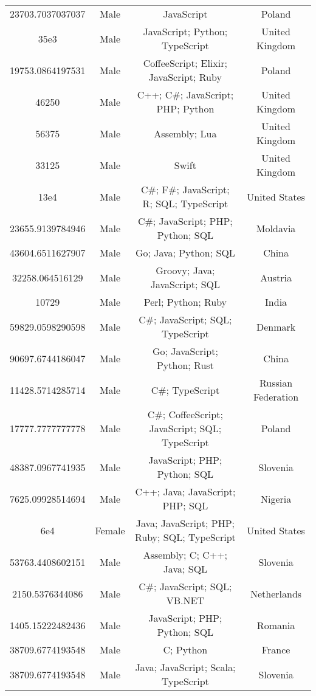 \begin{center}
\begin{tabular}{ |c|c|c|c| }
23703.7037037037  &  Male  &  JavaScript  &  Poland  \\ 
35e3  &  Male  &  JavaScript; Python; TypeScript  &  United Kingdom  \\ 
19753.0864197531  &  Male  &  CoffeeScript; Elixir; JavaScript; Ruby  &  Poland  \\ 
46250  &  Male  &  C++; C\#; JavaScript; PHP; Python  &  United Kingdom  \\ 
56375  &  Male  &  Assembly; Lua  &  United Kingdom  \\ 
33125  &  Male  &  Swift  &  United Kingdom  \\ 
13e4  &  Male  &  C\#; F\#; JavaScript; R; SQL; TypeScript  &  United States  \\ 
23655.9139784946  &  Male  &  C\#; JavaScript; PHP; Python; SQL  &  Moldavia  \\ 
43604.6511627907  &  Male  &  Go; Java; Python; SQL  &  China  \\ 
32258.064516129  &  Male  &  Groovy; Java; JavaScript; SQL  &  Austria  \\ 
10729  &  Male  &  Perl; Python; Ruby  &  India  \\ 
59829.0598290598  &  Male  &  C\#; JavaScript; SQL; TypeScript  &  Denmark  \\ 
90697.6744186047  &  Male  &  Go; JavaScript; Python; Rust  &  China  \\ 
11428.5714285714  &  Male  &  C\#; TypeScript  &  Russian Federation  \\ 
17777.7777777778  &  Male  &  C\#; CoffeeScript; JavaScript; SQL; TypeScript  &  Poland  \\ 
48387.0967741935  &  Male  &  JavaScript; PHP; Python; SQL  &  Slovenia  \\ 
7625.09928514694  &  Male  &  C++; Java; JavaScript; PHP; SQL  &  Nigeria  \\ 
6e4  &  Female  &  Java; JavaScript; PHP; Ruby; SQL; TypeScript  &  United States  \\ 
53763.4408602151  &  Male  &  Assembly; C; C++; Java; SQL  &  Slovenia  \\ 
2150.5376344086  &  Male  &  C\#; JavaScript; SQL; VB.NET  &  Netherlands  \\ 
1405.15222482436  &  Male  &  JavaScript; PHP; Python; SQL  &  Romania  \\ 
38709.6774193548  &  Male  &  C; Python  &  France  \\ 
38709.6774193548  &  Male  &  Java; JavaScript; Scala; TypeScript  &  Slovenia  \\ 

\end{tabular}
\end{center}
